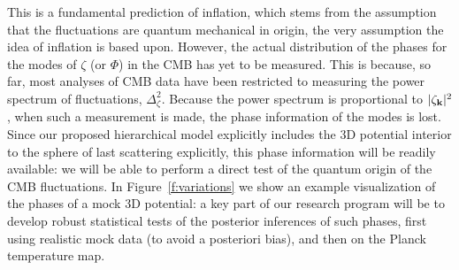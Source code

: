 \documentclass[psfig,12pt]{article}
\def\be{\begin{equation}}
\def\ee{\end{equation}}
\begin{document}
{This is a
fundamental prediction of inflation, which stems from the assumption that
the fluctuations are quantum mechanical in origin, the very assumption
the idea of inflation is based upon.
However, the actual distribution of the phases for the modes of $\zeta$
(or $\Phi$) in the CMB has yet to be measured. This is because, so far,
most analyses of CMB data have been restricted to measuring
the power spectrum of
fluctuations, $\Delta_\zeta^2$.
Because the power spectrum is proportional to $ |\zeta_{{\bf k}}|^2$,
when such a measurement is made, the phase information of the modes is
lost.
Since our proposed hierarchical model explicitly
includes the 3D potential interior to the sphere of last scattering
explicitly,
this phase information will
be readily available:
we will be able to perform a direct test of the quantum
origin of the CMB fluctuations. In Figure~\ref{f:variations} we
show an example visualization of the phases of a mock 3D potential:
a key part of our research program will be to develop
robust statistical
tests of the posterior inferences of such phases, first using realistic
mock data (to avoid {a posteriori} bias),
and then on the Planck temperature map.

}
\end{document}
